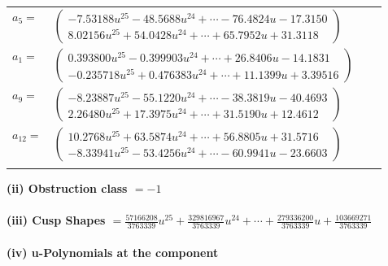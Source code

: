\documentclass[1p]{elsarticle_modified}
\theoremstyle{definition}
\begin{document}
\begin{tabular}{m{7pt} m{180pt} m{7pt} m{180pt} }
\flushright $a_{5}=$&$\begin{pmatrix}-7.53188 u^{25}-48.5688 u^{24}+\cdots-76.4824 u-17.3150\\8.02156 u^{25}+54.0428 u^{24}+\cdots+65.7952 u+31.3118\end{pmatrix}$ \\
\flushright $a_{1}=$&$\begin{pmatrix}0.393800 u^{25}-0.399903 u^{24}+\cdots+26.8406 u-14.1831\\-0.235718 u^{25}+0.476383 u^{24}+\cdots+11.1399 u+3.39516\end{pmatrix}$ \\
\flushright $a_{9}=$&$\begin{pmatrix}-8.23887 u^{25}-55.1220 u^{24}+\cdots-38.3819 u-40.4693\\2.26480 u^{25}+17.3975 u^{24}+\cdots+31.5190 u+12.4612\end{pmatrix}$ \\
\flushright $a_{12}=$&$\begin{pmatrix}10.2768 u^{25}+63.5874 u^{24}+\cdots+56.8805 u+31.5716\\-8.33941 u^{25}-53.4256 u^{24}+\cdots-60.9941 u-23.6603\end{pmatrix}$\\&\end{tabular}
\flushleft \textbf{(ii) Obstruction class $= -1$}\\~\\
\flushleft \textbf{(iii) Cusp Shapes $= \frac{57166208}{3763339} u^{25}+\frac{329816967}{3763339} u^{24}+\cdots+\frac{279336200}{3763339} u+\frac{103669271}{3763339}$}\\~\\
\newpage\renewcommand{\arraystretch}{1}
\flushleft \textbf{(iv) u-Polynomials at the component}\newline \\
\end{document}
